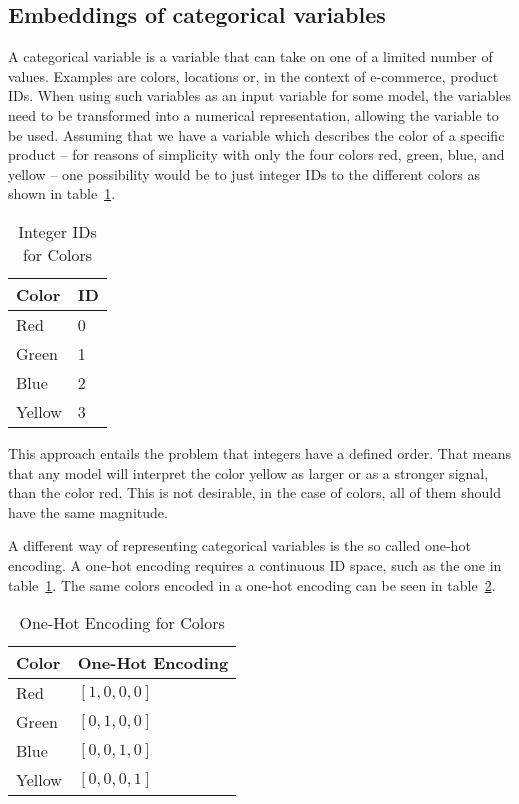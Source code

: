 \subsection{Embeddings of categorical variables}
A categorical variable is a variable that can take on one of a limited number of values.
Examples are colors, locations or, in the context of e-commerce, product IDs.
When using such variables as an input variable for some model, the variables need to be transformed into a numerical representation, allowing the variable to be used.
Assuming that we have a variable which describes the color of a specific product -- for reasons of simplicity with only the four colors red, green, blue, and yellow -- one possibility would be to just integer IDs to the different colors as shown in table~\ref{tab:id_encoding}.
\begin{table}[t]
    \centering
    \begin{tabular}{ll}\toprule
    \textbf{Color} & \textbf{ID} \\ \midrule
    Red & 0 \\
    Green & 1 \\
    Blue & 2 \\
    Yellow & 3 \\ \bottomrule
    \end{tabular}
    \caption{Integer IDs for Colors}
    \label{tab:id_encoding}
\end{table}
This approach entails the problem that integers have a defined order.
That means that any model will interpret the color yellow as larger or as a stronger signal, than the color red.
This is not desirable, in the case of colors, all of them should have the same magnitude.
\par
A different way of representing categorical variables is the so called one-hot encoding.
A one-hot encoding requires a continuous ID space, such as the one in table~\ref{tab:id_encoding}.
The same colors encoded in a one-hot encoding can be seen in table~\ref{tab:one_hot_encoding}.
\begin{table}[t]
    \centering
    \begin{tabular}{ll}\toprule
        \textbf{Color} & \textbf{One-Hot Encoding} \\ \midrule
    Red & $[1,0,0,0]$ \\
    Green & $[0,1,0,0]$ \\
    Blue & $[0,0,1,0]$ \\
    Yellow & $[0,0,0,1]$ \\ \bottomrule
    \end{tabular}
    \caption{One-Hot Encoding for Colors}
    \label{tab:one_hot_encoding}
\end{table}
